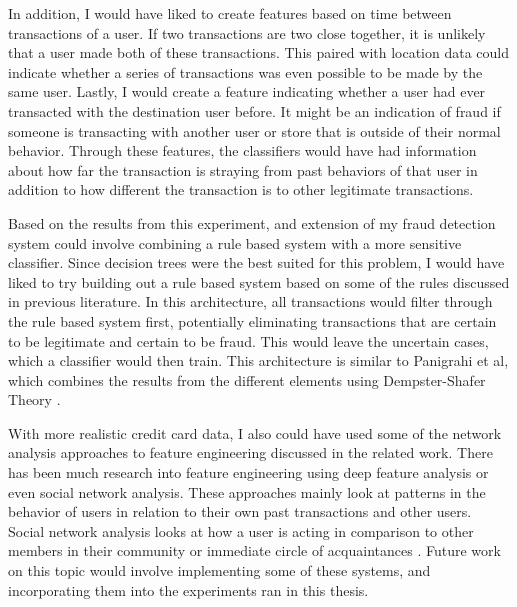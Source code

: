 \documentclass[midd]{thesis}
\begin{document}
In addition, I would have liked to create features based on time between transactions of a user. If two transactions are two close together, it is unlikely that a user made both of these transactions. This paired with location data could indicate whether a series of transactions was even possible to be made by the same user. Lastly, I would create a feature indicating whether a user had ever transacted with the destination user before. It might be an indication of fraud if someone is transacting with another user or store that is outside of their normal behavior. Through these features, the classifiers would have had information about how far the transaction is straying from past behaviors of that user in addition to how different the transaction is to other legitimate transactions.

Based on the results from this experiment, and extension of my fraud detection system could involve combining a rule based system with a more sensitive classifier. Since decision trees were the best suited for this problem, I would have liked to try building out a rule based system based on some of the rules discussed in previous literature. In this architecture, all transactions would filter through the rule based system first, potentially eliminating transactions that are certain to be legitimate and certain to be fraud. This would leave the uncertain cases, which a classifier would then train. This architecture is similar to Panigrahi et al, which combines the results from the different elements using Dempster-Shafer Theory \cite{Panigrahi2009}.

With more realistic credit card data, I also could have used some of the network analysis approaches to feature engineering discussed in the related work. There has been much research into feature engineering using deep feature analysis or even social network analysis. These approaches mainly look at patterns in the behavior of users in relation to their own past transactions and other users. Social network analysis looks at how a user is acting in comparison to other members in their community or immediate circle of acquaintances \cite{Baesens}. Future work on this topic would involve implementing some of these systems, and incorporating them into the experiments ran in this thesis.   






\end{document}
